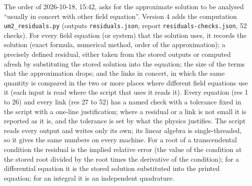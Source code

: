 \documentclass[
  10pt,
]{article}
\begin{document}
The order of 2026-10-18, 15:42, asks for the approximate solution to be
analysed ``usually in concert with other field equation''. Version 4
adds the computation \texttt{um2\_residuals.py} (outputs
\texttt{residuals.json}, report \texttt{residuals-checks.json}, 52
checks). For every field equation (or system) that the solution uses, it
records the solution (exact formula, numerical method, order of the
approximation); a precisely defined residual, either taken from the
stored outputs or computed afresh by substituting the stored solution
into the equation; the size of the terms that the approximation drops;
and the links in concert, in which the same quantity is compared in the
two or more places where different field equations use it (each input is
read where the script that uses it reads it). Every equation (res 1 to
26) and every link (res 27 to 52) has a named check with a tolerance
fixed in the script with a one-line justification; where a residual or a
link is not small it is reported as it is, and the tolerance is set by
what the physics justifies. The script reads every output and writes
only its own; its linear algebra is single-threaded, so it gives the
same numbers on every machine. For a root of a transcendental condition
the residual is the implied relative error (the value of the condition
at the stored root divided by the root times the derivative of the
condition); for a differential equation it is the stored solution
substituted into the printed equation; for an integral it is an
independent quadrature.
\end{document}
